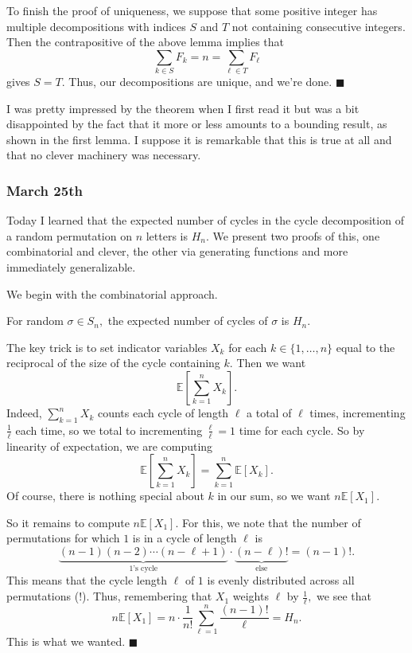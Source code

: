 To finish the proof of uniqueness, we suppose that some positive integer has multiple decompositions with indices $S$ and $T$ not containing consecutive integers. Then the contrapositive of the above lemma implies that
\[\sum_{k\in S}F_k=n=\sum_{\ell\in T}F_\ell\]
gives $S=T.$ Thus, our decompositions are unique, and we're done. $\blacksquare$

I was pretty impressed by the theorem when I first read it but was a bit disappointed by the fact that it more or less amounts to a bounding result, as shown in the first lemma. I suppose it is remarkable that this is true at all and that no clever machinery was necessary.

\subsubsection{March 25th}
Today I learned that the expected number of cycles in the cycle decomposition of a random permutation on $n$ letters is $H_n.$ We present two proofs of this, one combinatorial and clever, the other via generating functions and more immediately generalizable.

We begin with the combinatorial approach.
\begin{theorem}
    For random $\sigma\in S_n,$ the expected number of cycles of $\sigma$ is $H_n.$
\end{theorem}
The key trick is to set indicator variables $X_k$ for each $k\in\{1,\ldots,n\}$ equal to the reciprocal of the size of the cycle containing $k.$ Then we want
\[\mathbb E\left[\sum_{k=1}^nX_k\right].\]
Indeed, $\sum_{k=1}^nX_k$ counts each cycle of length $\ell$ a total of $\ell$ times, incrementing $\frac1\ell$ each time, so we total to incrementing $\frac\ell\ell=1$ time for each cycle. So by linearity of expectation, we are computing
\[\mathbb E\left[\sum_{k=1}^nX_k\right]=\sum_{k=1}^n\mathbb E[X_k].\]
Of course, there is nothing special about $k$ in our sum, so we want $n\mathbb E[X_1].$

So it remains to compute $n\mathbb E[X_1].$ For this, we note that the number of permutations for which $1$ is in a cycle of length $\ell$ is
\[\underbrace{(n-1)(n-2)\cdots(n-\ell+1)}_{1\text{'s cycle}}\cdot\underbrace{(n-\ell)!}_{\text{else}}=(n-1)!.\]
This means that the cycle length $\ell$ of $1$ is evenly distributed across all permutations (!). Thus, remembering that $X_1$ weights $\ell$ by $\frac1\ell,$ we see that 
\[n\mathbb E[X_1]=n\cdot\frac1{n!}\sum_{\ell=1}^n\frac{(n-1)!}\ell=H_n.\]
This is what we wanted. $\blacksquare$

